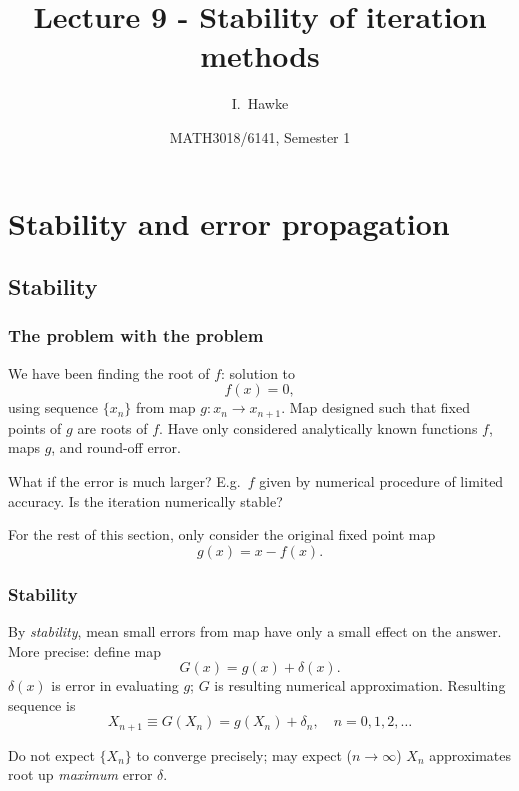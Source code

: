 \documentclass{beamer}
\title[Lecture 9] %
{Lecture 9 - Stability of iteration methods}
\author[I. Hawke] %
{I.~Hawke}
\institute[University of Southampton] %
{
  School of Mathematics, \\
  University of Southampton, UK
}
\date[Semester 1] %
{MATH3018/6141, Semester 1}
\begin{document}
\begin{frame}
  \titlepage
\end{frame}


\section{Stability and error propagation}

\subsection{Stability}

\begin{frame}
  \frametitle{The problem with the problem}

  We have been finding the root of $f$: solution to
  \begin{equation*}
    f(x) = 0,
  \end{equation*}
  using sequence $\{x_n\}$ from map $g : x_n \rightarrow x_{n+1}$. Map
  designed such that fixed points of $g$ are roots of $f$. Have only
  considered analytically known functions $f$, maps $g$, and round-off
  error. \pause

  \vspace{1ex}

  What if the error is much larger? E.g.\ $f$ given by numerical
  procedure of limited accuracy. Is the iteration numerically stable? \pause

  \vspace{1ex}

  For the rest of this section, only consider the original fixed
  point map
  \begin{equation*}
    g(x) = x - f(x).
  \end{equation*}

\end{frame}

\begin{frame}
  \frametitle{Stability}

  By \emph{stability}, mean small errors from map have only a small
  effect on the answer. \pause More precise: define map
  \begin{equation*}
    G(x) = g(x) + \delta(x).
  \end{equation*}
  $\delta(x)$ is error in evaluating $g$; $G$ is resulting
  numerical approximation. Resulting sequence is
  \begin{equation*}
    X_{n+1} \equiv G(X_n) = g(X_n) + \delta_n, \quad n = 0, 1, 2,
    \dots
  \end{equation*} \pause

  Do not expect $\{X_n\}$ to converge precisely; may expect ($n \to
  \infty$) $X_n$ approximates root up \emph{maximum} error $\delta$.

\end{frame}
\end{document}
